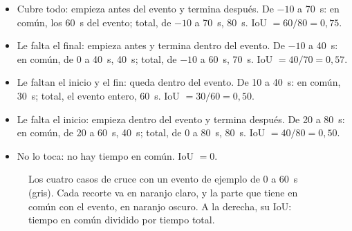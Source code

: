 \documentclass[11pt,a4paper,oneside,spanish,oldfontcommands]{memoir}
\begin{document}
\begin{itemize}
\item Cubre todo: empieza antes del evento y termina después. De
  $-10$ a 70~s: en común, los 60~s del evento; total, de $-10$ a 70~s, 80~s.
  IoU $= 60/80 = 0{,}75$.
\item Le falta el final: empieza antes y termina dentro del evento. De
  $-10$ a 40~s: en común, de 0 a 40~s, 40~s; total, de $-10$ a 60~s, 70~s.
  IoU $= 40/70 = 0{,}57$.
\item Le faltan el inicio y el fin: queda dentro del evento. De 10 a
  40~s: en común, 30~s; total, el evento entero, 60~s. IoU $= 30/60 = 0{,}50$.
\item Le falta el inicio: empieza dentro del evento y termina después.
  De 20 a 80~s: en común, de 20 a 60~s, 40~s; total, de 0 a 80~s, 80~s.
  IoU $= 40/80 = 0{,}50$.
\item No lo toca: no hay tiempo en común. IoU $= 0$.
\end{itemize}

\begin{figure}[H]
\centering
{}
\caption{Los cuatro casos de cruce con un evento de ejemplo de 0 a 60~s (gris). Cada recorte va en naranjo claro, y la parte que tiene en común con el evento, en naranjo oscuro. A la derecha, su IoU: tiempo en común dividido por tiempo total.}\label{fig:iou-casos}
\end{figure}
\end{document}
